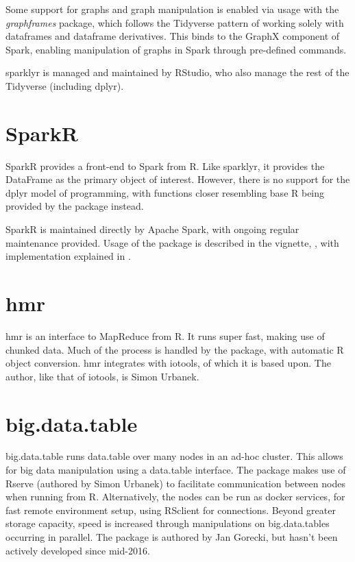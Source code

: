 \documentclass[10pt,a4paper]{article}
\begin{document}
Some support for graphs and graph manipulation is enabled via usage with the
\textit{graphframes} package, which follows the Tidyverse pattern of working
solely with dataframes and dataframe derivatives\cite{kuo18}. This binds to the GraphX
component of Spark, enabling manipulation of graphs in Spark through
pre-defined commands.

sparklyr is managed and maintained by RStudio, who also manage the
rest of the Tidyverse (including dplyr).

\section{SparkR}
\label{sec:sparkr}

SparkR provides a front-end to Spark from
R\cite{venkataraman20:_spark}. Like sparklyr, it provides the
DataFrame as the primary object of interest. However, there is no
support for the dplyr model of programming, with functions closer
resembling base R being provided by the package instead.

SparkR is maintained directly by Apache Spark, with ongoing regular
maintenance provided. Usage of the package is described in the
vignette, \textcite{venktaraman19:_spark_pract_guide}, with
implementation explained in \textcite{venkataraman2016sparkr}.

\section{hmr}
\label{sec:hmr}

hmr is an interface to MapReduce from R\cite{urbanek20}. It runs super
fast, making use of chunked data. Much of the process is handled by
the package, with automatic R object conversion. hmr integrates with
iotools, of which it is based upon. The author, like that of iotools,
is Simon Urbanek.

\section{big.data.table}
\label{sec:big.data.table}

big.data.table runs data.table over many nodes in an ad-hoc
cluster\cite{gorecki16}. This allows for big data manipulation using a
data.table interface. The package makes use of Rserve (authored by
Simon Urbanek) to facilitate communication between nodes when running
from R. Alternatively, the nodes can be run as docker services, for
fast remote environment setup, using RSclient for connections. Beyond
greater storage capacity, speed is increased through manipulations on
big.data.tables occurring in parallel. The package is authored by Jan
Gorecki, but hasn't been actively developed since mid-2016.

\printbibliography{}
\end{document}

